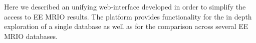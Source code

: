 Here we described an unifying web-interface developed in order to simplify the access to EE MRIO results. The platform provides functionality for the in depth exploration of a single database as well as for the comparison across several EE MRIO databases.